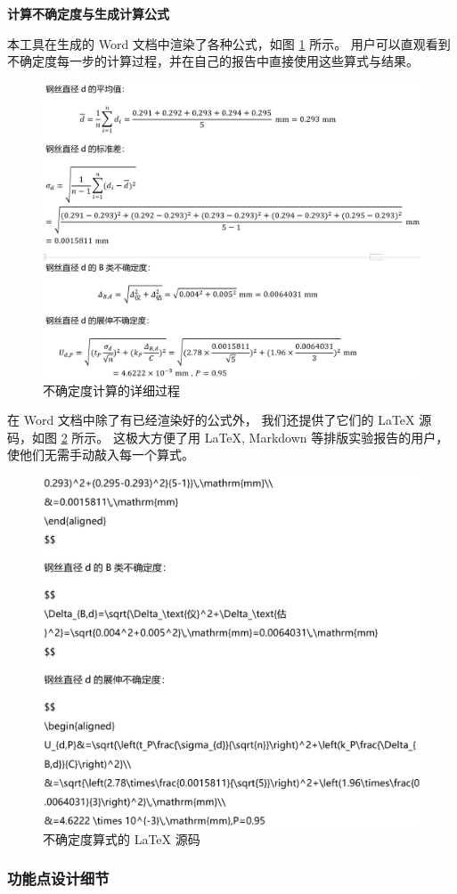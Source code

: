 {\noindent\bfseries\textbullet{}计算不确定度与生成计算公式}

本工具在生成的 Word 文档中渲染了各种公式，如图 \ref{fig:calc} 所示。
用户可以直观看到不确定度每一步的计算过程，并在自己的报告中直接使用这些算式与结果。

\begin{figure}[p]
  \centering
  \includegraphics[width=0.67\columnwidth]{figure/calc.png}
  \caption{不确定度计算的详细过程}
  \label{fig:calc}
\end{figure}

在 Word 文档中除了有已经渲染好的公式外，
我们还提供了它们的 \LaTeX{} 源码，如图 \ref{fig:latex} 所示。
这极大方便了用 \LaTeX{}, Markdown 等排版实验报告的用户，使他们无需手动敲入每一个算式。

\begin{figure}[htbp]
  \centering
  \includegraphics[width=0.67\columnwidth]{figure/latex.png}
  \caption{不确定度算式的 \LaTeX{} 源码}
  \label{fig:latex}
\end{figure}

\subsubsection{功能点设计细节}

